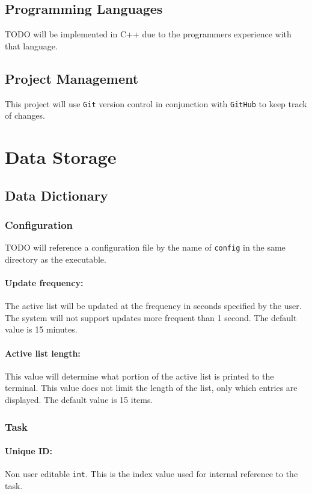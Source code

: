 \documentclass[12pt]{article}
\newcommand{\e}[1] {{\tt #1}}
\begin{document}
\subsection{Programming Languages}
TODO will be implemented in C++ due to the programmers experience with that language.

\subsection{Project Management}
This project will use {\tt Git} version control in conjunction with {\tt GitHub} to keep track of changes.

\section{Data Storage}\label{sec:Data Storage}
\subsection{Data Dictionary}\label{sec:Data Dictionary}
\subsubsection{Configuration} \label{sec:Configuration}
 TODO will reference a configuration file by the name of \e{config} in the same directory as the executable.
\paragraph{Update frequency:} \label{sec:Update timing} The active list will be updated at the frequency in seconds specified by the user. The system will not support updates more frequent than 1 second. The default value is 15 minutes.
\paragraph{Active list length:} \label{sec:Active list length} This value will determine what portion of the active list is printed to the terminal. This value does not limit the length of the list, only which entries are displayed. The default value is 15 items.

\subsubsection{Task} \label{sec:Task}
\paragraph{Unique ID:} Non user editable \e{int}. This is the index value used for internal reference to the task. 
\end{document}
